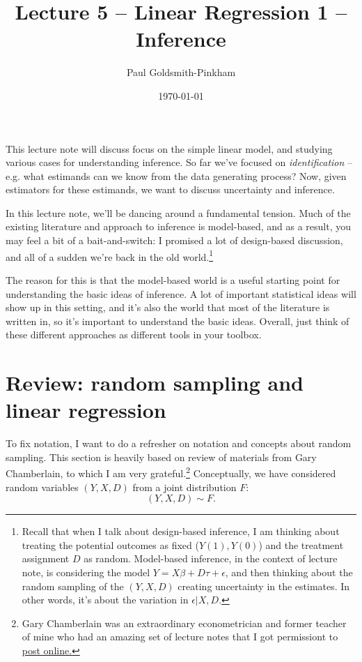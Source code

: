 \documentclass{tufte-handout}
\title{Lecture 5 -- Linear Regression 1 -- Inference}
\author{Paul Goldsmith-Pinkham}
\date{\today}
\theoremstyle{break}
\begin{document}
\maketitle

This lecture note will discuss focus on the simple linear model, and studying various cases for understanding inference. So far we've focused on \emph{identification} -- e.g. what estimands can we know from the data generating process? Now, given estimators for these estimands, we want to discuss uncertainty and inference.

In this lecture note, we'll be dancing around a fundamental tension. Much of the existing literature and approach to inference is model-based, and as a result, you may feel a bit of a bait-and-switch: I promised a lot of design-based discussion, and all of a sudden we're back in the old world.\footnote{Recall that when I talk about design-based inference, I am thinking about treating the potential outcomes as fixed ($Y(1), Y(0)$) and the treatment assignment $D$ as random. Model-based inference, in the context of lecture note, is considering the model $Y = X\beta + D\tau + \epsilon$, and then thinking about the random sampling of the $(Y, X, D)$ creating uncertainty in the estimates. In other words, it's about the variation in $\epsilon | X,D$.}

The reason for this is that the model-based world is a useful starting point for understanding the basic ideas of inference. A lot of important statistical ideas will show up in this setting,  and it's also the world that most of the literature is written in, so it's important to understand the basic ideas. Overall, just think of these different approaches as different tools in your toolbox.

\section{Review: random sampling and linear regression}
To fix notation, I want to do a refresher on notation and concepts about random sampling. This section is heavily based on review of materials from Gary Chamberlain, to which I am very grateful.\footnote{Gary Chamberlain was an extraordinary econometrician and former teacher of mine who had an amazing set of lecture notes that I got permissiont to \href{https://github.com/paulgp/GaryChamberlainLectureNotes/tree/main}{post online.}} Conceptually, we have considered random variables $(Y, X, D)$ from a joint distribution $F$:
\begin{equation}
  (Y, X, D) \sim F.
\end{equation}
\end{document}
